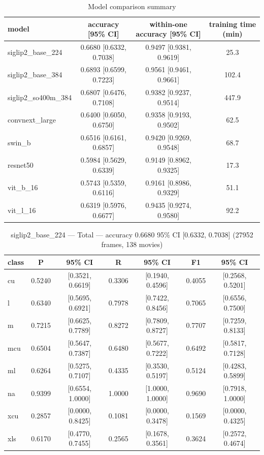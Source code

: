 
\begin{table}[htbp]
\centering
\caption{Model comparison summary}
\label{tab:summary}
\begin{tabular}{lccc}
\toprule
model & accuracy [95\% CI] & within-one accuracy [95\% CI] & training time (min) \\
\midrule
siglip2\_base\_224 & 0.6680 [0.6332, 0.7038] & 0.9497 [0.9381, 0.9619] & 25.3 \\
siglip2\_base\_384 & 0.6893 [0.6599, 0.7223] & 0.9561 [0.9461, 0.9661] & 102.4 \\
siglip2\_so400m\_384 & 0.6807 [0.6476, 0.7108] & 0.9382 [0.9237, 0.9514] & 447.9 \\
convnext\_large & 0.6400 [0.6050, 0.6750] & 0.9358 [0.9193, 0.9502] & 62.5 \\
swin\_b & 0.6516 [0.6161, 0.6857] & 0.9420 [0.9269, 0.9548] & 68.7 \\
resnet50 & 0.5984 [0.5629, 0.6339] & 0.9149 [0.8962, 0.9325] & 17.3 \\
vit\_b\_16 & 0.5743 [0.5359, 0.6116] & 0.9161 [0.8986, 0.9329] & 51.1 \\
vit\_l\_16 & 0.6319 [0.5976, 0.6677] & 0.9435 [0.9274, 0.9580] & 92.2 \\
\bottomrule
\end{tabular}
\end{table}

\begin{table}[htbp]
\centering
\caption{siglip2\_base\_224 — Total — accuracy 0.6680 95\% CI [0.6332, 0.7038] (27952 frames, 138 movies)}
\label{tab:siglip2-base-224-total}
\begin{tabular}{lcccccc}
\toprule
class & P & 95\% CI & R & 95\% CI & F1 & 95\% CI \\
\midrule
cu & 0.5240 & [0.3521, 0.6619] & 0.3306 & [0.1940, 0.4596] & 0.4055 & [0.2568, 0.5201] \\
l & 0.6340 & [0.5695, 0.6921] & 0.7978 & [0.7422, 0.8456] & 0.7065 & [0.6556, 0.7500] \\
m & 0.7215 & [0.6625, 0.7789] & 0.8272 & [0.7809, 0.8727] & 0.7707 & [0.7259, 0.8133] \\
mcu & 0.6504 & [0.5647, 0.7387] & 0.6480 & [0.5677, 0.7222] & 0.6492 & [0.5817, 0.7128] \\
ml & 0.6264 & [0.5275, 0.7107] & 0.4335 & [0.3530, 0.5197] & 0.5124 & [0.4283, 0.5899] \\
na & 0.9399 & [0.6554, 1.0000] & 1.0000 & [1.0000, 1.0000] & 0.9690 & [0.7918, 1.0000] \\
xcu & 0.2857 & [0.0000, 0.8425] & 0.1081 & [0.0000, 0.3478] & 0.1569 & [0.0000, 0.4325] \\
xls & 0.6170 & [0.4770, 0.7455] & 0.2565 & [0.1678, 0.3561] & 0.3624 & [0.2572, 0.4674] \\
\bottomrule
\end{tabular}
\end{table}

